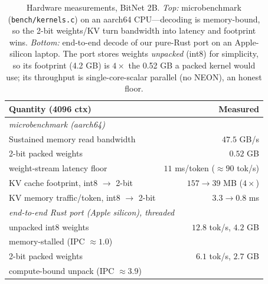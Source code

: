 \documentclass[11pt]{article}
\begin{document}
\begin{table}[t]\centering\small
\caption{Hardware measurements, BitNet 2B. \emph{Top:} microbenchmark
(\texttt{bench/kernels.c}) on an aarch64 CPU---decoding is memory-bound, so the
2-bit weights/KV turn bandwidth into latency and footprint wins. \emph{Bottom:}
end-to-end decode of our pure-Rust port on an Apple-silicon laptop. The port stores
weights \emph{unpacked} (int8) for simplicity, so its footprint (4.2 GB) is $4\times$
the 0.52 GB a packed kernel would use; its throughput is single-core-scalar parallel
(no NEON), an honest floor.}
\label{tab:hw}
\begin{tabular}{lr}
\toprule
Quantity (4096 ctx) & Measured\\
\midrule
\multicolumn{2}{l}{\emph{microbenchmark (aarch64)}}\\
Sustained memory read bandwidth & $47.5$ GB/s\\
2-bit packed weights & $0.52$ GB\\
\;\;weight-stream latency floor & $11$ ms/token ($\approx\!90$ tok/s)\\
KV cache footprint, int8 $\to$ 2-bit & $157 \to 39$ MB ($4\times$)\\
KV memory traffic/token, int8 $\to$ 2-bit & $3.3 \to 0.8$ ms\\
\midrule
\multicolumn{2}{l}{\emph{end-to-end Rust port (Apple silicon), threaded}}\\
unpacked int8 weights & $12.8$ tok/s, $4.2$ GB\\
\;\;memory-stalled (IPC $\approx\!1.0$) & \\
2-bit packed weights & $6.1$ tok/s, $2.7$ GB\\
\;\;compute-bound unpack (IPC $\approx\!3.9$) & \\
\bottomrule
\end{tabular}
\end{table}
\end{document}
